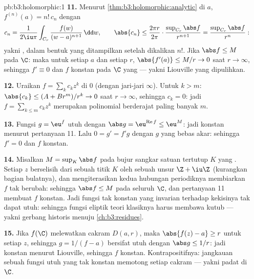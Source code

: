 \begin{solution}{pb:b3:holomorphic:1}
\textbf{11.} Menurut \cref{thm:b3:holomorphic:analytic} di $a$,
$f^{(n)}(a) = n!\,c_n$ dengan
\[
c_n = \frac1{2\iu\pi}\int_{C_r}\frac{f(w)}{(w -
a)^{n+1}}\,\dd w,
\qquad
\abs{c_n} \leq \frac{2\pi r}{2\pi}\cdot
\frac{\sup_{C_r}\abs f}{r^{n+1}}
= \frac{\sup_{C_r}\abs f}{r^{n}} :
\]
yakni , dalam bentuk yang ditampilkan setelah
dikalikan $n!$. Jika $\abs f \leq M$ pada $\C$: maka untuk setiap
$a$ dan setiap $r$, $\abs{f'(a)} \leq M/r \to 0$ saat $r \to
\infty$, sehingga $f' \equiv 0$ dan $f$ konstan pada
$\C$ yang  --- yakni Liouville yang dipulihkan.

\textbf{12.} Uraikan $f = \sum_kc_kz^k$ di $0$ (dengan jari-jari
$\infty$). Untuk $k > m$: $\abs{c_k} \leq (A + Br^m)/r^k \to
0$ saat $r \to \infty$, sehingga $c_k = 0$: jadi $f =
\sum_{k\leq m}c_kz^k$ merupakan polinomial berderajat paling banyak $m$.

\textbf{13.} Fungsi $g = \eu^f$ utuh dengan $\abs g =
\eu^{\operatorname{Re}f} \leq \eu^M$: jadi konstan menurut pertanyaan
11. Lalu $0 = g' = f'g$ dengan $g$ yang bebas akar: sehingga $f' = 0$ dan $f$
konstan.

\textbf{14.} Misalkan $M = \sup_K\abs f$ pada bujur sangkar satuan
tertutup $K$ yang . Setiap $z$ berselisih dari sebuah titik $K$ oleh sebuah
unsur $\Z + \iu\Z$ (kurangkan bagian bulatnya), dan
mengiterasikan kedua hubungan periodiknya membiarkan $f$
tak berubah: sehingga $\abs f \leq M$ pada seluruh $\C$, dan pertanyaan 11
membuat $f$ konstan. Jadi fungsi tak konstan yang invarian
terhadap kekisinya tak dapat utuh: sehingga fungsi eliptik
teori klasiknya harus membawa kutub --- yakni gerbang historis
menuju \cref{ch:b3:residues}.

\textbf{15.} Jika $f(\C)$ melewatkan cakram $D(a, r)$, maka
$\abs{f(z) - a} \geq r$ untuk setiap $z$, sehingga $g = 1/(f - a)$ bersifat
utuh dengan $\abs g \leq 1/r$: jadi konstan menurut Liouville, sehingga
$f$ konstan. Kontrapositifnya: jangkauan sebuah fungsi utuh
yang tak konstan memotong setiap cakram --- yakni padat di $\C$.


\end{solution}
